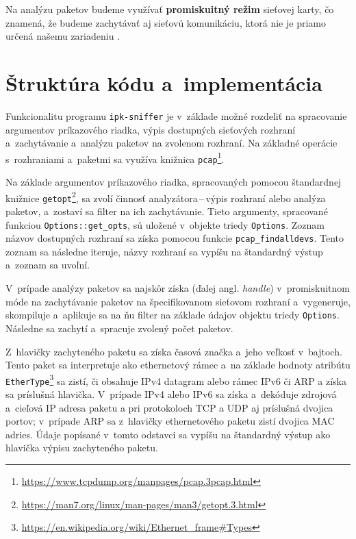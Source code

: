\documentclass[a4paper, 11pt, twocolumn]{article}
\begin{document}
    Na analýzu paketov budeme využívať \textbf{promiskuitný režim} sieťovej karty, čo znamená, že budeme zachytávať aj sieťovú komunikáciu, ktorá nie je priamo určená našemu zariadeniu \cite{promisc}.


\section{Štruktúra kódu a~implementácia}
    Funkcionalitu programu \texttt{ipk-sniffer} je v~základe možné rozdeliť na spracovanie argumentov príkazového riadka, výpis dostupných sieťových rozhraní a~zachytávanie a~analýzu paketov na zvolenom rozhraní. Na základné operácie s~rozhraniami a~paketmi sa využíva knižnica \texttt{pcap}\footnote{\href{https://www.tcpdump.org/manpages/pcap.3pcap.html}{https://www.tcpdump.org/manpages/pcap.3pcap.html}}.
    
    Na základe argumentov príkazového riadka, spracovaných pomocou štandardnej knižnice \texttt{getopt}\footnote{\href{https://man7.org/linux/man-pages/man3/getopt.3.html}{https://man7.org/linux/man-pages/man3/getopt.3.html}}, sa zvolí činnosť analyzátora\,--\,výpis rozhraní alebo analýza paketov, a~zostaví sa filter na ich zachytávanie. Tieto argumenty, spracované funkciou \texttt{Options::get\_opts}, sú uložené v~objekte triedy \texttt{Options}. Zoznam názvov dostupných rozhraní sa získa pomocou funkcie \texttt{pcap\_findalldevs}. Tento zoznam sa následne iteruje, názvy rozhraní sa vypíšu na štandardný výstup a~zoznam sa uvoľní.
    
    V~prípade analýzy paketov sa najskôr získa  (ďalej angl. \textit{handle}) v~promiskuitnom móde na zachytávanie paketov na špecifikovanom sieťovom rozhraní a~vygeneruje, skompiluje a~aplikuje sa na ňu filter na základe údajov objektu triedy \texttt{Options}. Následne sa zachytí a~spracuje zvolený počet paketov.
    
    Z~hlavičky zachyteného paketu sa získa časová značka a~jeho veľkosť v~bajtoch. Tento paket sa interpretuje ako ethernetový rámec a~na základe hodnoty atribútu \texttt{EtherType}\footnote{\href{https://en.wikipedia.org/wiki/Ethernet\_frame\#Types}{https://en.wikipedia.org/wiki/Ethernet\_frame\#Types}} sa zistí, či obsahuje IPv4 datagram alebo rámec IPv6 či ARP a získa sa príslušná hlavička. V~prípade IPv4 alebo IPv6 sa získa a~dekóduje zdrojová a~cieľová IP adresa paketu a pri protokoloch TCP a UDP aj príslušná dvojica portov; v~prípade ARP sa z~hlavičky ethernetového paketu zistí dvojica MAC adries. Údaje popísané v~tomto odstavci sa vypíšu na štandardný výstup ako hlavička výpisu zachyteného paketu.
    
\end{document}
